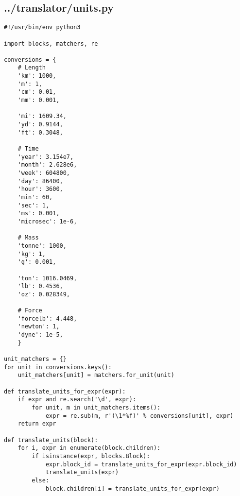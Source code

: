 \subsection*{../translator/units.py}
\begin{lstlisting}
#!/usr/bin/env python3

import blocks, matchers, re

conversions = {
    # Length
    'km': 1000,
    'm': 1,
    'cm': 0.01,
    'mm': 0.001,

    'mi': 1609.34,
    'yd': 0.9144,
    'ft': 0.3048,

    # Time
    'year': 3.154e7,
    'month': 2.628e6,
    'week': 604800,
    'day': 86400,
    'hour': 3600,
    'min': 60,
    'sec': 1,
    'ms': 0.001,
    'microsec': 1e-6,

    # Mass
    'tonne': 1000,
    'kg': 1,
    'g': 0.001,

    'ton': 1016.0469,
    'lb': 0.4536,
    'oz': 0.028349,

    # Force
    'forcelb': 4.448,
    'newton': 1,
    'dyne': 1e-5,
    }

unit_matchers = {}
for unit in conversions.keys():
    unit_matchers[unit] = matchers.for_unit(unit)

def translate_units_for_expr(expr):
    if expr and re.search('\d', expr):
        for unit, m in unit_matchers.items():
            expr = re.sub(m, r'(\1*%f)' % conversions[unit], expr)
    return expr

def translate_units(block):
    for i, expr in enumerate(block.children):
        if isinstance(expr, blocks.Block):
            expr.block_id = translate_units_for_expr(expr.block_id)
            translate_units(expr)
        else:
            block.children[i] = translate_units_for_expr(expr)
\end{lstlisting}

